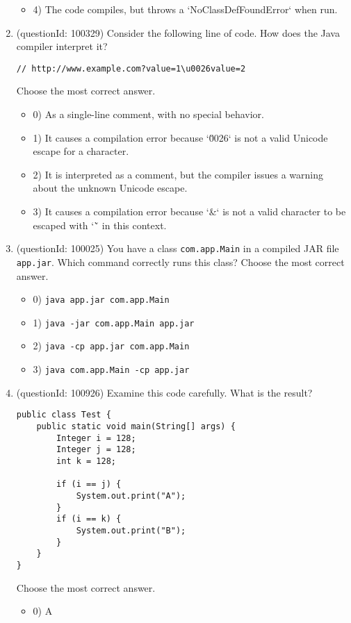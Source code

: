 \documentclass[12pt]{article}
\begin{document}
\begin{enumerate}[label=(\arabic*)]
\begin{itemize}
\item 4) The code compiles, but throws a `NoClassDefFoundError` when run.

\end{itemize}
\item (questionId: 100329) Consider the following line of code. How does the Java compiler interpret it?
\begin{verbatim}
// http://www.example.com?value=1\u0026value=2
\end{verbatim}
Choose the most correct answer. 
\begin{itemize}
\item 0) As a single-line comment, with no special behavior.

\item 1) It causes a compilation error because `\u0026` is not a valid Unicode escape for a character.

\item 2) It is interpreted as a comment, but the compiler issues a warning about the unknown Unicode escape.

\item 3) It causes a compilation error because `&` is not a valid character to be escaped with `\u` in this context.

\end{itemize}
\item (questionId: 100025) You have a class \verb|com.app.Main| in a compiled JAR file \verb|app.jar|. Which command correctly runs this class?
Choose the most correct answer. 
\begin{itemize}
\item 0) \verb|java app.jar com.app.Main|

\item 1) \verb|java -jar com.app.Main app.jar|

\item 2) \verb|java -cp app.jar com.app.Main|

\item 3) \verb|java com.app.Main -cp app.jar|

\end{itemize}
\item (questionId: 100926) Examine this code carefully. What is the result?\n\begin{verbatim}
public class Test {
    public static void main(String[] args) {
        Integer i = 128;
        Integer j = 128;
        int k = 128;

        if (i == j) {
            System.out.print("A");
        }
        if (i == k) {
            System.out.print("B");
        }
    }
}
\end{verbatim}
Choose the most correct answer. 
\begin{itemize}
\item 0) A


\end{itemize}
\end{enumerate}
\end{document}
